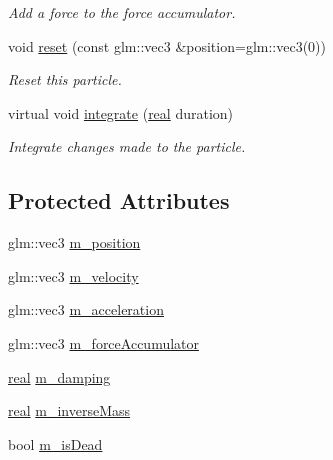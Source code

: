 \begin{DoxyCompactItemize}
\begin{DoxyCompactList}\small\item\em Add a force to the force accumulator. \end{DoxyCompactList}\item 
void \mbox{\hyperlink{classr3_1_1_particle_a28335c3bee5a6956ec43653f3b26f84a}{reset}} (const glm\+::vec3 \&position=glm\+::vec3(0))
\begin{DoxyCompactList}\small\item\em Reset this particle. \end{DoxyCompactList}\item 
virtual void \mbox{\hyperlink{classr3_1_1_particle_aff134984d9bc7409579e16eca3e42b68}{integrate}} (\mbox{\hyperlink{namespacer3_ab2016b3e3f743fb735afce242f0dc1eb}{real}} duration)
\begin{DoxyCompactList}\small\item\em Integrate changes made to the particle. \end{DoxyCompactList}\end{DoxyCompactItemize}
\subsection*{Protected Attributes}
\begin{DoxyCompactItemize}
\item 
glm\+::vec3 \mbox{\hyperlink{classr3_1_1_particle_ab7f5aa7cf48278441aab18db1a0c1ba9}{m\+\_\+position}}
\item 
glm\+::vec3 \mbox{\hyperlink{classr3_1_1_particle_a037d73e42df0c7bb9f1ae79b37301477}{m\+\_\+velocity}}
\item 
glm\+::vec3 \mbox{\hyperlink{classr3_1_1_particle_aa6c9d639f87a9291c60165c057e05a4f}{m\+\_\+acceleration}}
\item 
glm\+::vec3 \mbox{\hyperlink{classr3_1_1_particle_accfbf52627c85fa26c4df442873df497}{m\+\_\+force\+Accumulator}}
\item 
\mbox{\hyperlink{namespacer3_ab2016b3e3f743fb735afce242f0dc1eb}{real}} \mbox{\hyperlink{classr3_1_1_particle_a68034523bad4d9e4023f69b849197eb3}{m\+\_\+damping}}
\item 
\mbox{\hyperlink{namespacer3_ab2016b3e3f743fb735afce242f0dc1eb}{real}} \mbox{\hyperlink{classr3_1_1_particle_aad38f3126d055c2677ffe8f08089fc5c}{m\+\_\+inverse\+Mass}}
\item 
bool \mbox{\hyperlink{classr3_1_1_particle_a0a04ce870abc9017f09c2564344fda82}{m\+\_\+is\+Dead}}
\end{DoxyCompactItemize}


